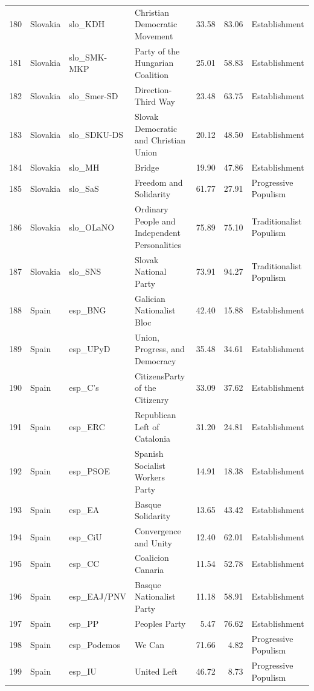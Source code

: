 \begin{landscape}
\begin{longtable}[c]{@{\extracolsep{\fill}}rlllrrl}
  180 & Slovakia & slo\_KDH & Christian Democratic Movement & 33.58 & 83.06 & Establishment \\ 
  181 & Slovakia & slo\_SMK-MKP & Party of the Hungarian Coalition & 25.01 & 58.83 & Establishment \\ 
  182 & Slovakia & slo\_Smer-SD & Direction-Third Way & 23.48 & 63.75 & Establishment \\ 
  183 & Slovakia & slo\_SDKU-DS & Slovak Democratic and Christian Union & 20.12 & 48.50 & Establishment \\ 
  184 & Slovakia & slo\_MH & Bridge & 19.90 & 47.86 & Establishment \\ 
  185 & Slovakia & slo\_SaS & Freedom and Solidarity & 61.77 & 27.91 & Progressive Populism \\ 
  186 & Slovakia & slo\_OLaNO & Ordinary People and Independent Personalities & 75.89 & 75.10 & Traditionalist Populism \\ 
  187 & Slovakia & slo\_SNS & Slovak National Party & 73.91 & 94.27 & Traditionalist Populism \\ 
  188 & Spain & esp\_BNG & Galician Nationalist Bloc & 42.40 & 15.88 & Establishment \\ 
  189 & Spain & esp\_UPyD & Union, Progress, and Democracy & 35.48 & 34.61 & Establishment \\ 
  190 & Spain & esp\_C's & CitizensParty of the Citizenry & 33.09 & 37.62 & Establishment \\ 
  191 & Spain & esp\_ERC & Republican Left of Catalonia & 31.20 & 24.81 & Establishment \\ 
  192 & Spain & esp\_PSOE & Spanish Socialist Workers Party & 14.91 & 18.38 & Establishment \\ 
  193 & Spain & esp\_EA & Basque Solidarity & 13.65 & 43.42 & Establishment \\ 
  194 & Spain & esp\_CiU & Convergence and Unity & 12.40 & 62.01 & Establishment \\ 
  195 & Spain & esp\_CC & Coalicion Canaria & 11.54 & 52.78 & Establishment \\ 
  196 & Spain & esp\_EAJ/PNV & Basque Nationalist Party & 11.18 & 58.91 & Establishment \\ 
  197 & Spain & esp\_PP & Peoples Party & 5.47 & 76.62 & Establishment \\ 
  198 & Spain & esp\_Podemos & We Can & 71.66 & 4.82 & Progressive Populism \\ 
  199 & Spain & esp\_IU & United Left & 46.72 & 8.73 & Progressive Populism \\ 

\end{longtable}
\end{landscape}
